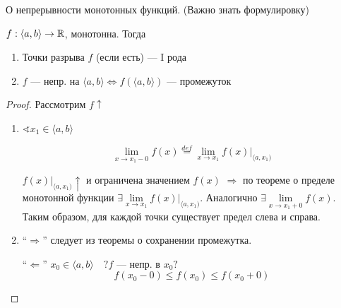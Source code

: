     \begin{theorem}
        О непрерывности монотонных функций. (Важно знать формулировку)

        $f:\langle a,b\rangle \to\mathbb{R}$, монотонна. Тогда
        \begin{enumerate}
            \item Точки разрыва $f$ (если есть) --- I рода
            \item $f$ --- непр. на $\langle a,b\rangle \Leftrightarrow f(\langle a,b\rangle)$ --- промежуток
        \end{enumerate}
    \end{theorem}
    \begin{proof}
        Рассмотрим $f\uparrow$
        \begin{enumerate}
            \item $\sphericalangle x_1\in\langle a,b\rangle$
            
            $$\lim\limits_{x\to x_1-0} f(x)\stackrel{def}{=}\lim\limits_{x\to x_1} f(x)|_{\langle a,x_1)}$$

            $f(x)|_{\langle a,x_1)}\uparrow$ и ограничена значением $f(x)$ $\Rightarrow$ по теореме о пределе монотонной функции $\exists\lim\limits_{x\to x_1} f(x)|_{\langle a,x_1)}$. Аналогично $\exists\lim\limits_{x\to x_1+0} f(x)$. Таким образом, для каждой точки существует предел слева и справа.
            
            \item ``$\Rightarrow$'' следует из теоремы о сохранении промежутка.
            
            ``$\Leftarrow$'' $x_0\in\langle a,b\rangle \quad ?f$ --- непр. в $x_0?$
            $$f(x_0-0)\leq f(x_0)\leq f(x_0+0)$$
        \end{enumerate}
    \end{proof}

